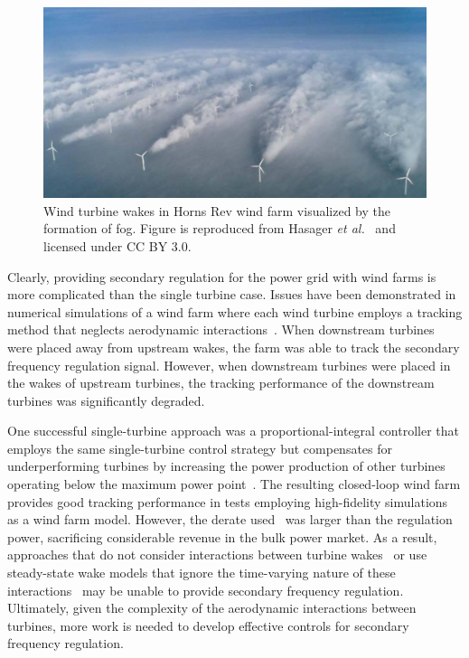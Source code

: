 \begin{figure}[h]
\begin{center}
\includegraphics[width=\textwidth]{./fig/wind_farm.png}
\end{center}
\caption{Wind turbine wakes in Horns Rev wind farm visualized by the formation of fog. Figure is reproduced from Hasager \textit{et al.}~\cite{Hasager2013a} and licensed under CC BY 3.0.}
\label{fig:wind_farm_wake}
\end{figure}

Clearly, providing secondary regulation for the power grid with wind farms is more complicated than the single turbine case. Issues have been demonstrated in numerical simulations of a wind farm where each wind turbine employs a tracking method that neglects aerodynamic interactions~\cite{Fleming2016a}. When downstream turbines were placed away from upstream wakes, the farm was able to track the secondary frequency regulation signal. However, when downstream turbines were placed in the wakes of upstream turbines, the tracking performance of the downstream turbines was significantly degraded. 

One successful single-turbine approach was a proportional-integral controller that employs the same single-turbine control strategy but compensates for underperforming turbines by increasing the power production of other turbines operating below the maximum power point~\cite{vanWingerden2017a}. The resulting closed-loop wind farm provides good tracking performance in tests employing high-fidelity simulations as a wind farm model. However, the derate used~\cite{vanWingerden2017a} was larger than the regulation power, sacrificing considerable revenue in the bulk power market. As a result, approaches that do not consider interactions between turbine wakes~\cite{Hansen2006a, Hansen2006b} or use steady-state wake models that ignore the time-varying nature of these interactions~\cite{Ahmadyar2015a, Badihi2015a} may be unable to provide secondary frequency regulation. Ultimately, given the complexity of the aerodynamic interactions between turbines, more work is needed to develop effective controls for secondary frequency regulation. 

